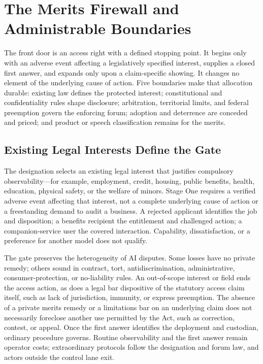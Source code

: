 \section{The Merits Firewall and Administrable Boundaries}
\label{sec:objections}

The front door is an access right with a defined stopping point. It begins only with an adverse event affecting a legislatively specified interest, supplies a closed first answer, and expands only upon a claim-specific showing. It changes no element of the underlying cause of action. Five boundaries make that allocation durable: existing law defines the protected interest; constitutional and confidentiality rules shape disclosure; arbitration, territorial limits, and federal preemption govern the enforcing forum; adoption and deterrence are conceded and priced; and product or speech classification remains for the merits.

\subsection{Existing Legal Interests Define the Gate}

The designation selects an existing legal interest that justifies compulsory observability---for example, employment, credit, housing, public benefits, health, education, physical safety, or the welfare of minors. Stage One requires a verified adverse event affecting that interest, not a complete underlying cause of action or a freestanding demand to audit a business. A rejected applicant identifies the job and disposition; a benefits recipient the entitlement and challenged action; a companion-service user the covered interaction. Capability, dissatisfaction, or a preference for another model does not qualify.

The gate preserves the heterogeneity of AI disputes. Some losses have no private remedy; others sound in contract, tort, antidiscrimination, administrative, consumer-protection, or no-liability rules. An out-of-scope interest or field ends the access action, as does a legal bar dispositive of the statutory access claim itself, such as lack of jurisdiction, immunity, or express preemption. The absence of a private merits remedy or a limitations bar on an underlying claim does not necessarily foreclose another use permitted by the Act, such as correction, contest, or appeal. Once the first answer identifies the deployment and custodian, ordinary procedure governs. Routine observability and the first answer remain operator costs; extraordinary protocols follow the designation and forum law, and actors outside the control lane exit.

